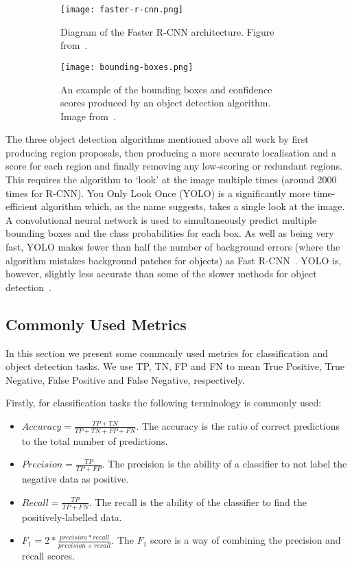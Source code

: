 \documentclass[../interim.tex]{subfiles}
\begin{document}
\begin{figure}
  \begin{subfigure}{0.4\textwidth}
    \centering
    \texttt{[image: faster-r-cnn.png]}
    \caption{Diagram of the Faster R-CNN architecture. Figure from~\cite{cnn-uses:faster-r-cnn}.}
    \label{fig:fasterrcnn}
  \end{subfigure}
  \hfill
  \begin{subfigure}{0.55\textwidth}
    \centering
    \texttt{[image: bounding-boxes.png]}
    \caption{An example of the bounding boxes and confidence scores produced by an object detection algorithm. Image from~\cite{obj-detection-examples}.}
    \label{fig:bounding-boxes}
  \end{subfigure}
  \caption{ }
\end{figure}

The three object detection algorithms mentioned above all work by first producing region proposals, then producing a more accurate localisation and a score for each region and finally removing any low-scoring or redundant regions. This requires the algorithm to `look' at the image multiple times (around 2000 times for R-CNN). You Only Look Once (YOLO) is a significantly more time-efficient algorithm which, as the name suggests, takes a single look at the image. A convolutional neural network is used to simultaneously predict multiple bounding boxes and the class probabilities for each box. As well as being very fast, YOLO makes fewer than half the number of background errors (where the algorithm mistakes background patches for objects) as Fast R-CNN~\cite{yolo}. YOLO is, however, slightly less accurate than some of the slower methods for object detection~\cite{cnn-uses:yolo-v3}.

\subsection{Commonly Used Metrics}

In this section we present some commonly used metrics for classification and object detection tasks. We use TP, TN, FP and FN to mean True Positive, True Negative, False Positive and False Negative, respectively.

Firstly, for classification tasks the following terminology is commonly used:
\begin{itemize}
  \item $Accuracy = \frac{TP + TN}{TP + TN + FP + FN}$. The accuracy is the ratio of correct predictions to the total number of predictions.

  \item $Precision = \frac{TP}{TP + FP}$. The precision is the ability of a classifier to not label the negative data as positive.

  \item $Recall = \frac{TP}{TP + FN}$. The recall is the ability of the classifier to find the positively-labelled data.

  \item $F_1 = 2 * \frac{precision * recall}{precision + recall}$. The $F_1$ score is a way of combining the precision and recall scores.
\end{itemize}
\end{document}
